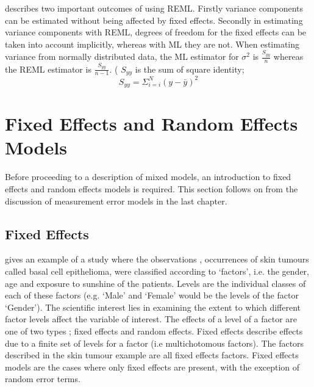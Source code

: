 \documentclass[12pt, a4paper]{report}
\theoremstyle{plain}
\theoremstyle{definition}
\theoremstyle{remark}
\begin{document}
\citet{McCullSearle} describes two important outcomes of using
REML. Firstly variance components can be estimated without being
affected by fixed effects. Secondly in estimating variance
components with REML, degrees of freedom for the fixed effects can
be taken into account implicitly, whereas with ML they are not.
When estimating variance from normally distributed data, the ML
estimator for $\sigma^{2}$ is $\frac{S_{yy}}{n}$ whereas the REML
estimator is $\frac{S_{yy}}{n-1}$. ( $S_{yy}$ is the sum of square
identity;
\begin{equation}
S_{yy} = \Sigma_{i=i}^{N} (y-\bar{y})^{2}
\end{equation}










\section{Fixed Effects and Random Effects Models}
Before proceeding to a description of mixed models, an
introduction to fixed effects and random effects models is
required. This section follows on from the discussion of
measurement error models in the last chapter.

\subsection{Fixed Effects}
\citet{McCullSearle} gives an example of a study where the
observations , occurrences of skin tumours called basal cell
epithelioma, were classified according to `factors', i.e. the
gender, age and exposure to sunshine of the patients. Levels are
the individual classes of each of these factors (e.g. `Male' and
`Female' would be the levels of the factor `Gender'). The
scientific interest lies in examining the extent to which
different factor levels affect the variable of interest. The
effects of a level of a factor are one of two types ; fixed
effects and random effects. Fixed effects describe effects due to
a finite set of levels for a factor (i.e multichotomous factors).
The factors described in the skin tumour example are all fixed
effects factors. Fixed effects models are the cases where only
fixed effects are present, with the exception of random error
terms.
\end{document}
